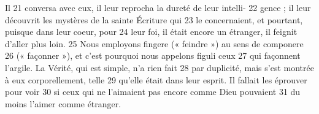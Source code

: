Il	 
21	 	conversa avec eux, il leur reprocha la dureté de leur intelli-	 
22	 	gence ; il leur découvrit les mystères de la sainte Écriture qui	 
23	 	le concernaient, et pourtant, puisque dans leur coeur, pour	 
24	 	leur foi, il était encore un étranger, il feignit d'aller plus loin.	 
25	 	Nous employons fingere (« feindre ») au sens de componere	 
26	 	(« façonner »), et c'est pourquoi nous appelons figuli ceux	 
27	 	qui façonnent l'argile. La Vérité, qui est simple, n'a rien fait	 
28	 	par duplicité, mais s'est montrée à eux corporellement, telle	 
29	 	qu'elle était dans leur esprit. Il fallait les éprouver pour voir	 
30	 	si ceux qui ne l'aimaient pas encore comme Dieu pouvaient	 
31	 	du moins l'aimer comme étranger.